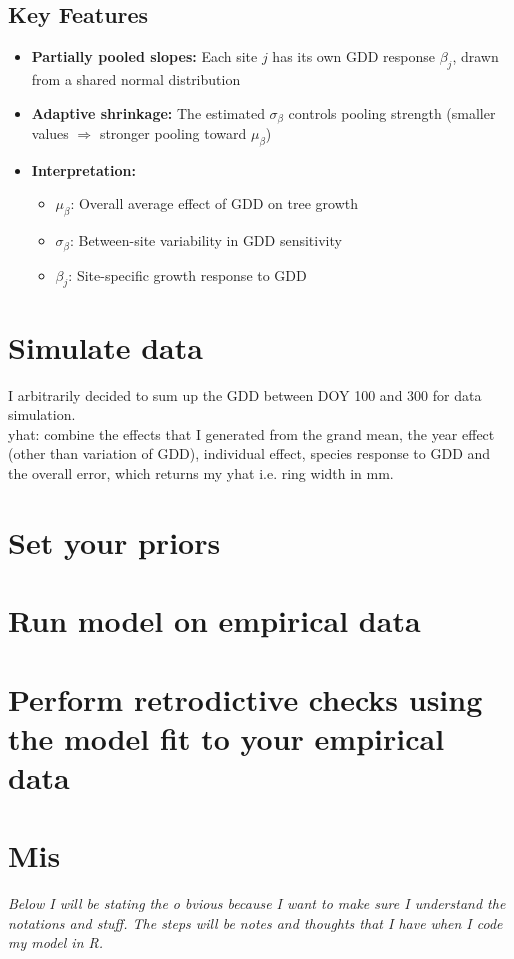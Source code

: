 \documentclass[a4paper,12pt]{article}
\begin{document}
\subsection*{Key Features}

\begin{itemize}
    \item \textbf{Partially pooled slopes:} Each site $j$ has its own GDD response $\beta_j$, drawn from a shared normal distribution
    \item \textbf{Adaptive shrinkage:} The estimated $\sigma_\beta$ controls pooling strength (smaller values $\Rightarrow$ stronger pooling toward $\mu_\beta$)
    \item \textbf{Interpretation:}
    \begin{itemize}
        \item $\mu_\beta$: Overall average effect of GDD on tree growth
        \item $\sigma_\beta$: Between-site variability in GDD sensitivity
        \item $\beta_j$: Site-specific growth response to GDD
    \end{itemize}
\end{itemize}




\section{Simulate data}
I arbitrarily decided to sum up the GDD between DOY 100 and 300 for data simulation. \\
yhat: combine the effects that I generated from the grand mean, the year effect (other than variation of GDD), individual effect, species response to GDD and the overall error, which returns my yhat i.e. ring width in mm.

\section{Set your priors}

\section{Run model on empirical data}

\section{Perform retrodictive checks using the model fit to your empirical data}

\section{Mis}

\newpage
\textit{Below I will be stating the o bvious because I want to make sure I understand the notations and stuff. The steps will be notes and thoughts that I have when I code my model in R.}
\end{document}
